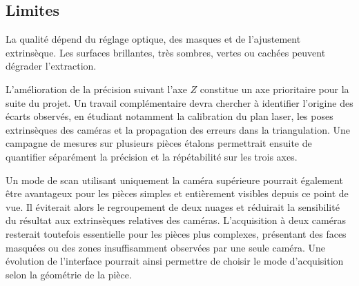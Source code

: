 \subsection{Limites}

La qualité dépend du réglage optique, des masques et de l'ajustement
extrinsèque. Les surfaces brillantes, très sombres, vertes ou cachées peuvent
dégrader l'extraction.

L'amélioration de la précision suivant l'axe $Z$ constitue un axe prioritaire
pour la suite du projet. Un travail complémentaire devra chercher à identifier
l'origine des écarts observés, en étudiant notamment la calibration du plan
laser, les poses extrinsèques des caméras et la propagation des erreurs dans la
triangulation. Une campagne de mesures sur plusieurs pièces étalons permettrait
ensuite de quantifier séparément la précision et la répétabilité sur les trois
axes.

Un mode de scan utilisant uniquement la caméra supérieure pourrait également
être avantageux pour les pièces simples et entièrement visibles depuis ce
point de vue. Il éviterait alors le regroupement de deux nuages et réduirait la
sensibilité du résultat aux extrinsèques relatives des caméras. L'acquisition
à deux caméras resterait toutefois essentielle pour les pièces plus complexes,
présentant des faces masquées ou des zones insuffisamment observées par une
seule caméra. Une évolution de l'interface pourrait ainsi permettre de choisir
le mode d'acquisition selon la géométrie de la pièce.

